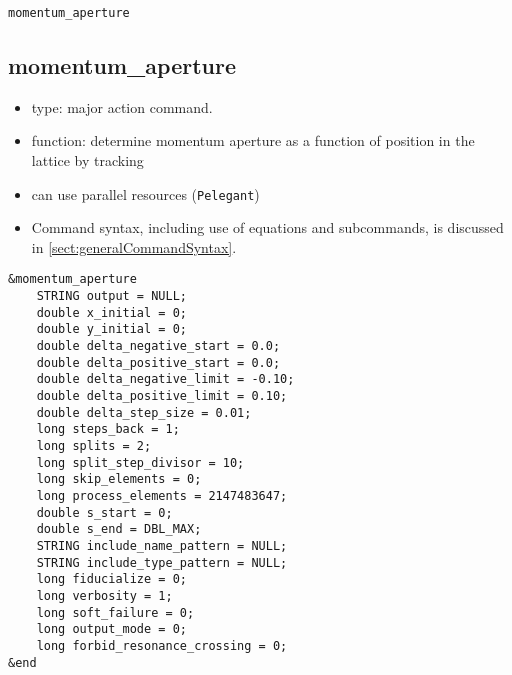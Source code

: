 \documentclass[11pt]{article}
\begin{document}
\newpage
\begin{center}{\Large\verb|momentum_aperture|}\end{center}
\subsection{momentum\_aperture \label{subsec:momentumaperture}}

\begin{itemize}
\item type: major action command.
\item function: determine momentum aperture as a function of position in the lattice by tracking
\item can use parallel resources (\verb|Pelegant|)
\item Command syntax, including use of equations and subcommands, is discussed in \ref{sect:generalCommandSyntax}.
\end{itemize}

\begin{verbatim}
&momentum_aperture
    STRING output = NULL;
    double x_initial = 0;
    double y_initial = 0;
    double delta_negative_start = 0.0;
    double delta_positive_start = 0.0;
    double delta_negative_limit = -0.10;
    double delta_positive_limit = 0.10;
    double delta_step_size = 0.01;
    long steps_back = 1;
    long splits = 2;
    long split_step_divisor = 10;
    long skip_elements = 0;
    long process_elements = 2147483647;
    double s_start = 0;
    double s_end = DBL_MAX;
    STRING include_name_pattern = NULL;
    STRING include_type_pattern = NULL;
    long fiducialize = 0;
    long verbosity = 1;
    long soft_failure = 0;
    long output_mode = 0;
    long forbid_resonance_crossing = 0;
&end
\end{verbatim}
\end{document}
